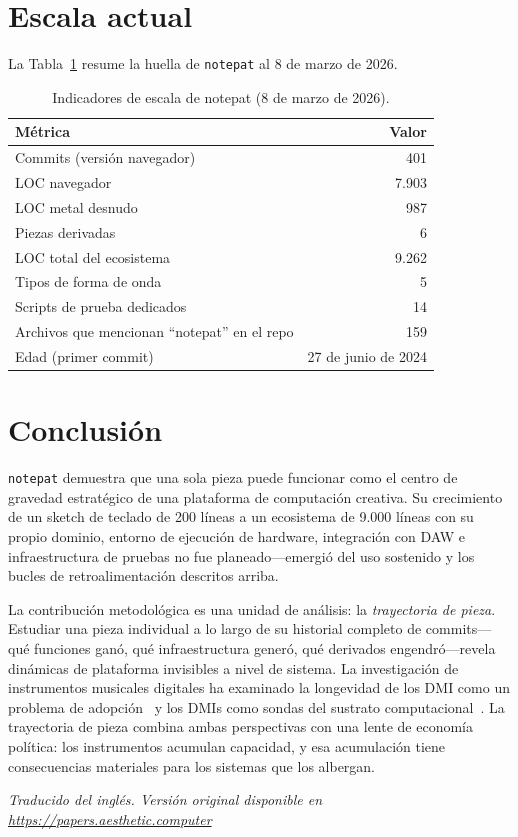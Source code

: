 \documentclass[10pt,letterpaper,twocolumn]{article}
\begin{document}
\section{Escala actual}

La Tabla~\ref{tab:scale} resume la huella de \texttt{notepat} al 8 de marzo de 2026.

\begin{table}[h]
\small
\centering
\begin{tabularx}{\columnwidth}{l r}
\toprule
\textbf{Métrica} & \textbf{Valor} \\
\midrule
Commits (versión navegador) & 401 \\
LOC navegador & 7.903 \\
LOC metal desnudo & 987 \\
Piezas derivadas & 6 \\
LOC total del ecosistema & 9.262 \\
Tipos de forma de onda & 5 \\
Scripts de prueba dedicados & 14 \\
Archivos que mencionan ``notepat'' en el repo & 159 \\
Edad (primer commit) & 27 de junio de 2024 \\
\bottomrule
\end{tabularx}
\caption{Indicadores de escala de notepat (8 de marzo de 2026).}
\label{tab:scale}
\end{table}

\section{Conclusión}

\texttt{notepat} demuestra que una sola pieza puede funcionar como el centro de gravedad estratégico de una plataforma de computación creativa. Su crecimiento de un sketch de teclado de 200 líneas a un ecosistema de 9.000 líneas con su propio dominio, entorno de ejecución de hardware, integración con DAW e infraestructura de pruebas no fue planeado---emergió del uso sostenido y los bucles de retroalimentación descritos arriba.

La contribución metodológica es una unidad de análisis: la \emph{trayectoria de pieza}. Estudiar una pieza individual a lo largo de su historial completo de commits---qué funciones ganó, qué infraestructura generó, qué derivados engendró---revela dinámicas de plataforma invisibles a nivel de sistema. La investigación de instrumentos musicales digitales ha examinado la longevidad de los DMI como un problema de adopción~\citep{marquez2018dmi} y los DMIs como sondas del sustrato computacional~\citep{tahiroglu2020probes}. La trayectoria de pieza combina ambas perspectivas con una lente de economía política: los instrumentos acumulan capacidad, y esa acumulación tiene consecuencias materiales para los sistemas que los albergan.

\vspace{0.5em}
\noindent\textit{Traducido del inglés. Versión original disponible en \url{https://papers.aesthetic.computer}}



\end{document}

